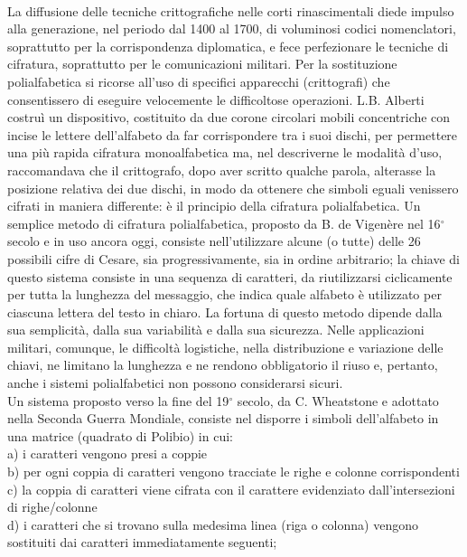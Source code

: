 \documentclass[a4paper,12pt]{tesiinfo}
\begin{document}
\\
La diffusione delle tecniche crittografiche nelle corti rinascimentali diede impulso alla generazione, nel periodo dal 1400 al 1700, di voluminosi codici nomenclatori, soprattutto per la corrispondenza diplomatica, e fece perfezionare le tecniche di cifratura, soprattutto per le comunicazioni militari. Per la sostituzione polialfabetica si ricorse all'uso di specifici apparecchi (crittografi) che consentissero di eseguire velocemente le difficoltose operazioni. L.B. Alberti costru\`i un dispositivo, costituito da due corone circolari mobili concentriche con incise le lettere dell'alfabeto da far corrispondere tra i suoi dischi, per permettere una pi\`u rapida cifratura monoalfabetica ma, nel descriverne le modalit\`a d'uso, raccomandava che il crittografo, dopo aver scritto qualche parola, alterasse la posizione relativa dei due dischi, in modo da ottenere che simboli eguali venissero cifrati in maniera differente: \`e il principio della cifratura polialfabetica.
Un semplice metodo di cifratura polialfabetica, proposto da B. de Vigen\`ere nel 16$^\circ$  secolo e in uso ancora oggi, consiste nell'utilizzare alcune (o tutte) delle 26 possibili cifre di Cesare, sia progressivamente, sia in ordine arbitrario; la chiave di questo sistema consiste in una sequenza di caratteri, da riutilizzarsi ciclicamente per tutta la lunghezza del messaggio, che indica quale alfabeto \`e utilizzato per ciascuna lettera del testo in chiaro. La fortuna di questo metodo dipende dalla sua semplicit\`a, dalla sua variabilit\`a e dalla sua sicurezza. Nelle applicazioni militari, comunque, le difficolt\`a logistiche, nella distribuzione e variazione delle chiavi, ne limitano la lunghezza e ne rendono obbligatorio il riuso e, pertanto, anche i sistemi polialfabetici non possono considerarsi sicuri.
\\
Un sistema proposto verso la fine del 19$^\circ$ secolo, da C. Wheatstone e adottato nella Seconda Guerra Mondiale, consiste nel disporre i simboli dell'alfabeto in una matrice (quadrato di Polibio) in cui:\\
a) i caratteri vengono presi a coppie\\
b) per ogni coppia di caratteri vengono tracciate le righe e colonne corrispondenti\\
c) la coppia di caratteri viene cifrata con il carattere evidenziato dall'intersezioni di righe/colonne\\
d) i caratteri che si trovano sulla medesima linea (riga o colonna) vengono sostituiti dai caratteri immediatamente seguenti;\\
\end{document}
